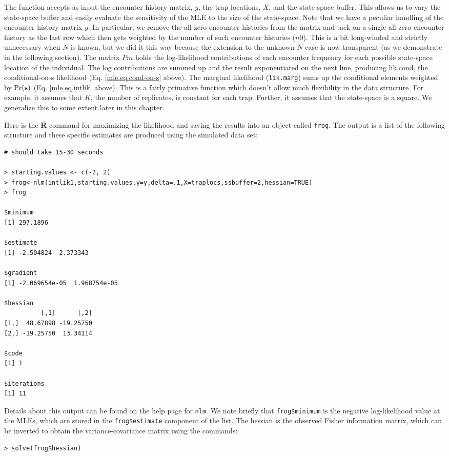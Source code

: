 The function accepts as
input the encounter history matrix, $y$, the trap locations, $X$, and the
state-space buffer. This allows us to vary the state-space buffer and
easily evaluate the sensitivity of the MLE to the size of the
state-space. 
Note that we have a peculiar handling of the encounter history
matrix $y$. In particular, we remove the all-zero encounter histories
from the matrix and tack-on a single all-zero encounter history as the
last row which then gets weighted by the number of such encounter
histories ($n0$). This is a bit long-winded and strictly unnecessary
when $N$ is known, but we did it this way because the extension to the
unknown-$N$ case is now transparent (as we demonstrate in the following
section). 
 The matrix $Pm$ holds the log-likelihood contributions of
each encounter frequency for each possible state-space location of the
individual. 
The log contributions are summed up and the result
exponentiated on the next line, producing lik.cond, the
conditional-on-s likelihood (Eq. \ref{mle.eq.cond-on-s}
above). The marginal
likelihood (\mbox{\tt lik.marg}) sums up the conditional elements weighted by
$\Pr({\bf s})$ (Eq. \ref{mle.eq.intlik} above).
This is a fairly primative function which doesn't allow much
flexibility in the data structure. For example, it assumes that $K$,
the number 
of replicates, is constant for each trap. Further, it assumes that the
state-space is a square. We generalize this to some extent later in
this chapter. 

Here is the {\bf R} command for maximizing the likelihood and saving the
results into an object called \mbox{\tt frog}.  The output is a list of the
following structure and these specific estimates are produced using
the simulated data set:

{\small 
\begin{verbatim}
# should take 15-30 seconds

> starting.values <- c(-2, 2) 
> frog<-nlm(intlik1,starting.values,y=y,delta=.1,X=traplocs,ssbuffer=2,hessian=TRUE)
> frog

$minimum
[1] 297.1896

$estimate
[1] -2.504824  2.373343

$gradient
[1] -2.069654e-05  1.968754e-05

$hessian
          [,1]      [,2]
[1,]  48.67898 -19.25750
[2,] -19.25750  13.34114

$code
[1] 1

$iterations
[1] 11
\end{verbatim}
} 
Details about this output can be found on the help page for
\mbox{\tt nlm}. We note briefly that \mbox{\tt frog\$minimum} is the
negative log-likelihood value at the MLEs, which are stored in the
\mbox{\tt frog\$estimate} component of the list. The hessian is the
observed Fisher information matrix, which can be inverted to obtain
the variance-covariance matrix using the commands:
\begin{verbatim}
> solve(frog$hessian)
\end{verbatim}

